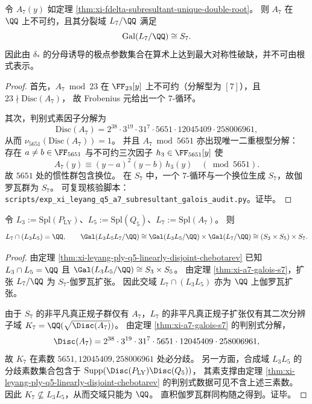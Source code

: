 \begin{theorem}\label{thm:xi-a7-galois-s7}
令 \(A_7(y)\) 如定理 \ref{thm:xi-fdelta-subresultant-unique-double-root}。
则 \(A_7\) 在 \(\QQ\) 上不可约，且其分裂域 \(L_7/\QQ\) 满足
\[
\operatorname{Gal}(L_7/\QQ)\cong S_7.
\]
因此由 \(\delta_\ast\) 的分母诱导的极点参数集合在算术上达到最大对称性破缺，并不可由根式表示。
\end{theorem}
\begin{proof}
首先，\(A_7\bmod 23\) 在 \(\FF_{23}[y]\) 上不可约（分解型为 \([7]\)），且 \(23\nmid \mathrm{Disc}(A_7)\)，
故 Frobenius 元给出一个 \(7\)-循环。

其次，判别式素因子分解为
\[
\mathrm{Disc}(A_7)=2^{38}\cdot 3^{19}\cdot 31^{7}\cdot 5651\cdot 12045409\cdot 258006961,
\]
从而 \(\nu_{5651}(\mathrm{Disc}(A_7))=1\)。
并且 \(A_7\bmod 5651\) 亦出现唯一二重根型分解：
存在 \(a\neq b\in\FF_{5651}\) 与不可约三次因子 \(h_3\in\FF_{5651}[y]\) 使
\[
A_7(y)\equiv (y-a)^2(y-b)\,h_3(y)\quad(\bmod 5651).
\]
故 \(5651\) 处的惯性群包含换位。
在 \(S_7\) 中，一个 \(7\)-循环与一个换位生成 \(S_7\)，故伽罗瓦群为 \(S_7\)。
可复现核验脚本：\texttt{scripts/exp\_xi\_leyang\_q5\_a7\_subresultant\_galois\_audit.py}。证毕。
\end{proof}

\begin{theorem}\label{thm:xi-leyang-a7-disjoint-from-ply-q5}
令 \(L_3:=\mathrm{Spl}(P_{\mathrm{LY}})\)、\(L_5:=\mathrm{Spl}(Q_5)\)、\(L_7:=\mathrm{Spl}(A_7)\)。
则
\[
L_7\cap (L_3L_5)=\QQ,
\qquad
\Gal(L_3L_5L_7/\QQ)\cong \Gal(L_3L_5/\QQ)\times \Gal(L_7/\QQ)\cong (S_3\times S_5)\times S_7.
\]
\end{theorem}
\begin{proof}
由定理 \ref{thm:xi-leyang-ply-q5-linearly-disjoint-chebotarev} 已知 \(L_3\cap L_5=\QQ\) 且 \(\Gal(L_3L_5/\QQ)\cong S_3\times S_5\)。
由定理 \ref{thm:xi-a7-galois-s7}，扩张 \(L_7/\QQ\) 为 \(S_7\)-伽罗瓦扩张。
因此交域 \(L_7\cap (L_3L_5)\) 亦为 \(\QQ\) 上伽罗瓦扩张。
\par
由于 \(S_7\) 的非平凡真正规子群仅有 \(A_7\)，\(L_7\) 的非平凡真正规子扩张仅有其二次分辨子域
\(
K_7=\QQ(\sqrt{\Disc(A_7)})
\)。
由定理 \ref{thm:xi-a7-galois-s7} 的判别式分解，
\[
\Disc(A_7)=2^{38}\cdot 3^{19}\cdot 31^{7}\cdot 5651\cdot 12045409\cdot 258006961,
\]
故 \(K_7\) 在素数 \(5651,12045409,258006961\) 处必分歧。
另一方面，合成域 \(L_3L_5\) 的分歧素数集合包含于
\(\mathrm{Supp}(\Disc(P_{\mathrm{LY}})\Disc(Q_5))\)，
其素支撑由定理 \ref{thm:xi-leyang-ply-q5-linearly-disjoint-chebotarev} 的判别式数据可见不含上述三素数。
因此 \(K_7\not\subseteq L_3L_5\)，从而交域只能为 \(\QQ\)。
直积伽罗瓦群同构随之得到。证毕。
\end{proof}

